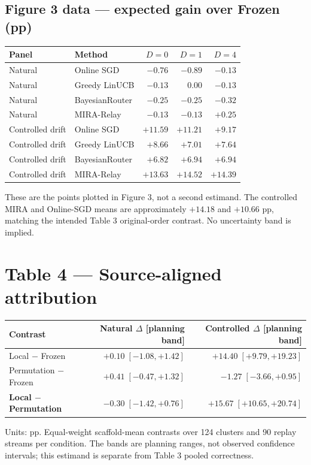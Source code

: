 \documentclass[10pt]{article}
\newcommand{\smallnote}[1]{{\footnotesize\color{Gray}#1}}
\begin{document}
\subsection*{Figure 3 data --- expected gain over Frozen (pp)}
\begin{tabularx}{\linewidth}{@{}llrrr@{}}
\toprule
Panel & Method & $D=0$ & $D=1$ & $D=4$ \\
\midrule
Natural & Online SGD & $-0.76$ & $-0.89$ & $-0.13$ \\
Natural & Greedy LinUCB & $-0.13$ & $0.00$ & $-0.13$ \\
Natural & BayesianRouter & $-0.25$ & $-0.25$ & $-0.32$ \\
Natural & MIRA-Relay & $-0.13$ & $-0.13$ & $+0.25$ \\
\midrule
Controlled drift & Online SGD & $+11.59$ & $+11.21$ & $+9.17$ \\
Controlled drift & Greedy LinUCB & $+8.66$ & $+7.01$ & $+7.64$ \\
Controlled drift & BayesianRouter & $+6.82$ & $+6.94$ & $+6.94$ \\
Controlled drift & MIRA-Relay & $+13.63$ & $+14.52$ & $+14.39$ \\
\bottomrule
\end{tabularx}
\smallnote{These are the points plotted in Figure 3, not a second estimand. The controlled MIRA and Online-SGD means are approximately $+14.18$ and $+10.66$ pp, matching the intended Table 3 original-order contrast. No uncertainty band is implied.}

\section*{Table 4 --- Source-aligned attribution}
\begin{tabularx}{\linewidth}{@{}lrr@{}}
\toprule
Contrast & Natural $\Delta$ [planning band] & Controlled $\Delta$ [planning band] \\
\midrule
Local $-$ Frozen & $+0.10\;[-1.08,+1.42]$ & $+14.40\;[+9.79,+19.23]$ \\
Permutation $-$ Frozen & $+0.41\;[-0.47,+1.32]$ & $-1.27\;[-3.66,+0.95]$ \\
\textbf{Local $-$ Permutation} & $-0.30\;[-1.42,+0.76]$ & \textbf{$+15.67\;[+10.65,+20.74]$} \\
\bottomrule
\end{tabularx}
\smallnote{Units: pp. Equal-weight scaffold-mean contrasts over 124 clusters and 90 replay streams per condition. The bands are planning ranges, not observed confidence intervals; this estimand is separate from Table 3 pooled correctness.}
\end{document}
